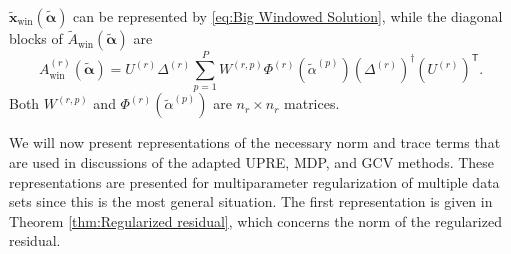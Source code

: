 \documentclass[12pt]{article}
\newcommand{\xVec}{\mathbf{x}}	%
\newcommand{\trans}[1]{{#1}^\mathsf{T}}	%
\newcommand{\pinv}[1]{{#1}^\dagger}	%
\newcommand{\regparam}{\alpha}  %
\newcommand{\regparamVec}{\bm{\regparam}}   %
\newcommand{\regparamBig}{\widetilde{\regparam}}   %
\newcommand{\regparamVecBig}{\widetilde{\regparamVec}}   %
\newcommand{\xBig}{\widetilde{\xVec}}	%
\newcommand{\xWinBig}{\xBig_{\text{win}}}	%
\newcommand{\AWin}{A_{\text{win}}}	%
\newcommand{\AWinBig}{\widetilde{A}_{\text{win}}}	%
\begin{document}
$\xWinBig(\regparamVecBig)$ can be represented by \eqref{eq:Big Windowed Solution}, while the diagonal blocks of $\AWinBig(\regparamVecBig)$ are
\begin{equation}
    \AWin^{(r)}(\regparamVecBig)
    = U^{(r)}\Delta^{(r)}\sum_{p=1}^{P}W^{(r,p)}\Phi^{(r)}\left(\regparamBig^{(p)}\right)\pinv{\left(\Delta^{(r)}\right)}\trans{\left(U^{(r)}\right)}. \label{eq:Windowed Big Influence Diagonals}
\end{equation}
Both $W^{(r,p)}$ and $\Phi^{(r)}(\regparamBig^{(p)})$ are $n_r \times n_r$ matrices. \par
We will now present representations of the necessary norm and trace terms that are used in discussions of the adapted UPRE, MDP, and GCV methods. These representations are presented for multiparameter regularization of multiple data sets since this is the most general situation. The first representation is given in Theorem \ref{thm:Regularized residual}, which concerns the norm of the regularized residual.
\end{document}
